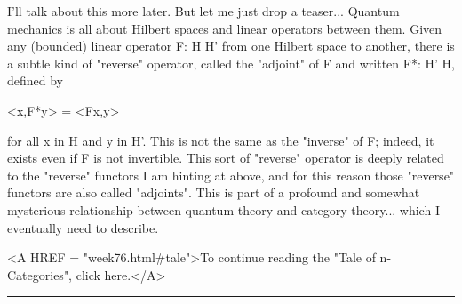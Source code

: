 I'll talk about this more later.  But let me just drop a teaser...
Quantum mechanics is all about Hilbert spaces and linear operators
between them.  Given any (bounded) linear operator F: H \to  H' from
one Hilbert space to another, there is a subtle kind of
"reverse" operator, called the "adjoint" of F and
written F*: H' \to  H, defined by

                      <x,F*y> = <Fx,y> 

for all x in H and y in H'.  This is not the same as the
"inverse" of F; indeed, it exists even if F is not invertible.
This sort of "reverse" operator is deeply related to the
"reverse" functors I am hinting at above, and for this reason
those "reverse" functors are also called "adjoints".
This is part of a profound and somewhat mysterious relationship between
quantum theory and category theory... which I eventually need to
describe.

<A HREF = "week76.html#tale">To continue reading the "Tale of
n-Categories", click here.</A>






\par\noindent\rule{\textwidth}{0.4pt}
